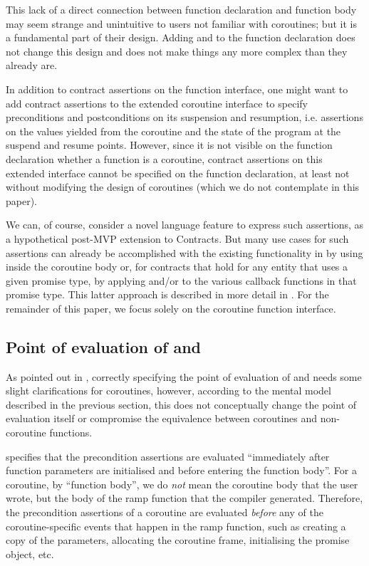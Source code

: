 This lack of a direct connection between function declaration and function body may seem strange and unintuitive to users not familiar with coroutines; but it is a fundamental part of their design. Adding  and  to the function declaration does not change this design and does not make things any more complex than they already are.

In addition to contract assertions on the function interface, one might want to add contract assertions to the extended coroutine interface to specify preconditions and postconditions on its suspension and resumption, i.e. assertions on the values yielded from the coroutine and the state of the program at the suspend and resume points. However, since it is not visible on the function declaration whether a function is a coroutine, contract assertions on this extended interface cannot be specified on the function declaration, at least not without modifying the design of coroutines (which we do not contemplate in this paper).

We can, of course, consider a novel language feature to express such assertions, as a hypothetical post-MVP extension to Contracts. But many use cases for such assertions can already be accomplished with the existing functionality in \cite{P2900R8} by using  inside the coroutine body or, for contracts that hold for any entity that uses a given promise type, by applying  and/or  to the various callback functions in that promise type. This latter approach is described in more detail in \cite{P3251R0}. For the remainder of this paper, we focus solely on the coroutine function interface.

\subsection{Point of evaluation of  and }

As pointed out in \cite{P2957R1}, correctly specifying the point of evaluation of  and  needs some slight clarifications for coroutines, however, according to the mental model described in the previous section, this does not conceptually change the point of evaluation itself or compromise the equivalence between coroutines and non-coroutine functions.

\cite{P2900R8} specifies that the precondition assertions are evaluated ``immediately after function parameters are initialised and before entering the function body''. For a coroutine, by ``function body'', we do \emph{not} mean the coroutine body that the user wrote, but the body of the ramp function that the compiler generated. Therefore, the precondition assertions of a coroutine are evaluated \emph{before} any of the coroutine-specific events that happen in the ramp function, such as creating a copy of the parameters, allocating the coroutine frame, initialising the promise object, etc.

